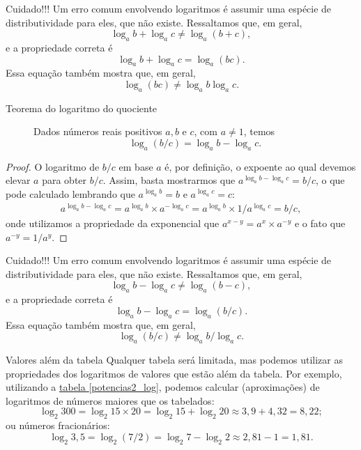 \begin{observation}{}
Cuidado!!! Um erro comum envolvendo logaritmos é assumir uma espécie de distributividade para eles, que não existe. Ressaltamos que, em geral,
$$
\log_a b + \log_a c \neq \log_a (b +c),
$$
e a propriedade correta é 
$$
\log_a b + \log_a c = \log_a (bc).
$$
Essa equação também mostra que, em geral,
$$
\log_a (bc) \neq \log_a b \log_a c.
$$
\end{observation}


\begin{description}
\item[Teorema do logaritmo do quociente]\label{teo_log_div} 
Dados números reais positivos $a,b$ e $c$, com $a \neq 1$, temos
$$
\log_a(b/c) = \log_a b - \log_a c.
$$
\end{description}
\begin{proof}
O logaritmo de $b/c$ em base $a$ é, por definição, o expoente ao qual devemos elevar $a$ para obter $b/c$. Assim, basta mostrarmos que $a^{\log_a b - \log_a c} =b/c$, o que pode calculado lembrando que $a^{\log_a b}=b$ e $a^{\log_a c}=c$:
\begin{align*}
a^{\log_a b - \log_a c} = a^{\log_a b} \times a^{-\log_a c} = a^{\log_a b} \times 1/ a^{\log_a c}  =b/c,
\end{align*}
onde utilizamos a propriedade da exponencial que $a^{x-y} = a^{x} \times a^{-y}$ e o fato que $a^{-y}=1/a^y$.
\end{proof}


\begin{observation}{}
Cuidado!!! Um erro comum envolvendo logaritmos é assumir uma espécie de distributividade para eles, que não existe. Ressaltamos que, em geral,
$$
\log_a b - \log_a c \neq \log_a (b - c),
$$
e a propriedade correta é 
$$
\log_a b - \log_a c = \log_a (b/c).
$$
Essa equação também mostra que, em geral,
$$
\log_a (b/c) \neq \log_a b/\log_a c.
$$
\end{observation}


\begin{example}{Valores além da tabela}
Qualquer tabela será limitada, mas podemos utilizar as propriedades dos logaritmos de valores que estão além da tabela. Por exemplo, utilizando a \hyperref[potencias2_log]{tabela \ref{potencias2_log}}, podemos calcular (aproximações) de logaritmos de números maiores que os tabelados:
$$
\log_2 300 = \log_2 15 \times 20 = \log_2 15 +\log_2 20 \approx 3{,}9 + 4{,}32 = 8{,}22;
$$
ou números fracionários:
$$
\log_2 3{,}5 = \log_2 (7/2) = \log_2 7 -\log_2 2 \approx 2{,}81 -1 = 1{,}81.
$$
\end{example}


